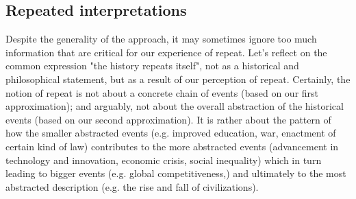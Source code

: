 \subsection{Repeated interpretations}

Despite the generality of the approach, it may sometimes ignore too much information that are critical for our experience of repeat. Let's reflect on the common expression "the history repeats itself", not as a historical and philosophical statement, but as a result of our perception of repeat. Certainly, the notion of repeat is not about a concrete chain of events (based on our first approximation); and arguably, not about the overall abstraction of the historical events (based on our second approximation). It is rather about the pattern of how the smaller abstracted events (e.g. improved education, war, enactment of certain kind of law) contributes to the more abstracted events (advancement in technology and innovation, economic crisis, social inequality) which in turn leading to bigger events (e.g. global competitiveness,) and ultimately to the most abstracted description (e.g. the rise and fall of civilizations). 



